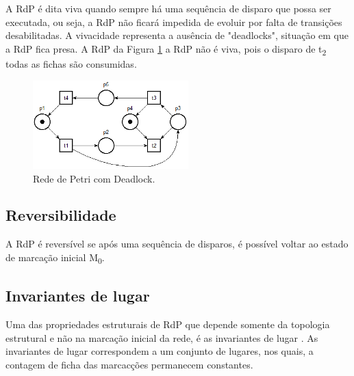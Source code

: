 A RdP \'e dita viva quando sempre h\'a uma sequ\^encia de disparo que possa ser executada, ou seja, a RdP n\~ao ficar\'a impedida de evoluir por falta de transi\c{c}\~oes desabilitadas. A vivacidade representa a aus\^encia de "deadlocks", situa\c{c}\~ao em que a RdP fica presa. A RdP da Figura \ref{fig:rdpdeadlock} a RdP n\~ao \'e viva, pois o disparo de t\textsubscript{2} todas as fichas s\~ao consumidas.

\begin{figure}[!htb]
	\caption[Rede de Petri com deadlock]{Rede de Petri com Deadlock.}
	\label{fig:rdpdeadlock}
	\includegraphics[width=6cm]{./figuras/RDP_DEADLOCK.png}\centering
\end{figure}

\subsection{Reversibilidade}

A RdP \'e revers\'ivel se ap\'os uma sequ\^encia de disparos, \'e poss\'ivel voltar ao estado de marca\c{c}\~ao inicial M\textsubscript{0}.

\subsection{Invariantes de lugar}

Uma das propriedades estruturais de RdP que depende somente da topologia estrutural e n\~ao na marca\c{c}\~ao inicial da rede, \'e as invariantes de lugar \cite{moody1998}. As invariantes de lugar correspondem a um conjunto de lugares, nos quais, a contagem de ficha das marcac\c{c}\~oes permanecem constantes.



